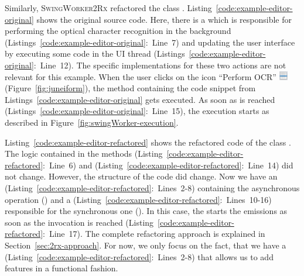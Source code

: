 \documentclass[type=bsc,accentcolor=tud9c]{tudthesis}
\newcommand{\toolextension}{\textsc{SwingWorker2Rx}}
\begin{document}
Similarly, \toolextension{} refactored the class . Listing~\ref{code:example-editor-original} shows the original source code. Here, there is a  which is responsible for performing the optical character recognition in the background (Listings~\ref{code:example-editor-original}:~Line~7) and updating the user interface by executing some code in the UI thread (Listings~\ref{code:example-editor-original}:~Line~12). The specific implementations for these two actions are not relevant for this example. When the user clicks on the icon ``Perform OCR'' \includegraphics[height=0.4cm]{juneiform/ocr-icon.png} (Figure~\ref{fig:juneiform}), the method containing the code snippet from Listings~\ref{code:example-editor-original} gets executed. As soon as  is reached (Listings~\ref{code:example-editor-original}:~Line~15), the  execution starts as described in Figure~\ref{fig:swingWorker-execution}. 



Listing~\ref{code:example-editor-refactored} shows the refactored code of the class . The logic contained in the methods  (Listing~\ref{code:example-editor-refactored}:~Line~6) and  (Listing~\ref{code:example-editor-refactored}:~Line~14) did not change. However, the structure of the code did change. Now we have an  (Listing~\ref{code:example-editor-refactored}:~Lines~2-8) containing the asynchronous operation () and a  (Listing~\ref{code:example-editor-refactored}:~Lines~10-16) responsible for the synchronous one (). In this case, the  starts the emissions as soon as the  invocation is reached (Listing~\ref{code:example-editor-refactored}:~Line~17). The complete refactoring approach is explained in Section~\ref{sec:2rx-approach}. For now, we only focus on the fact, that we have a  (Listing~\ref{code:example-editor-refactored}:~Lines~2-8) that allows us to add features in a functional fashion.


\end{document}
